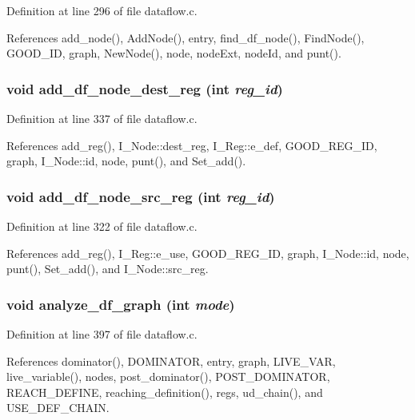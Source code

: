 Definition at line 296 of file dataflow.c.

References add\_\-node(), Add\-Node(), entry, find\_\-df\_\-node(), Find\-Node(), GOOD\_\-ID, graph, New\-Node(), node, node\-Ext, node\-Id, and punt().
\subsubsection{\setlength{\rightskip}{0pt plus 5cm}void add\_\-df\_\-node\_\-dest\_\-reg (int {\em reg\_\-id})}\label{dataflow_8h_f182228aef8e2118a879f42eeb3d7c1d}




Definition at line 337 of file dataflow.c.

References add\_\-reg(), I\_\-Node::dest\_\-reg, I\_\-Reg::e\_\-def, GOOD\_\-REG\_\-ID, graph, I\_\-Node::id, node, punt(), and Set\_\-add().
\subsubsection{\setlength{\rightskip}{0pt plus 5cm}void add\_\-df\_\-node\_\-src\_\-reg (int {\em reg\_\-id})}\label{dataflow_8h_90bb36d257114197da5da7233cce012c}




Definition at line 322 of file dataflow.c.

References add\_\-reg(), I\_\-Reg::e\_\-use, GOOD\_\-REG\_\-ID, graph, I\_\-Node::id, node, punt(), Set\_\-add(), and I\_\-Node::src\_\-reg.
\subsubsection{\setlength{\rightskip}{0pt plus 5cm}void analyze\_\-df\_\-graph (int {\em mode})}\label{dataflow_8h_35fcc36d70bd4a3e5bf901b0141aabea}




Definition at line 397 of file dataflow.c.

References dominator(), DOMINATOR, entry, graph, LIVE\_\-VAR, live\_\-variable(), nodes, post\_\-dominator(), POST\_\-DOMINATOR, REACH\_\-DEFINE, reaching\_\-definition(), regs, ud\_\-chain(), and USE\_\-DEF\_\-CHAIN.
